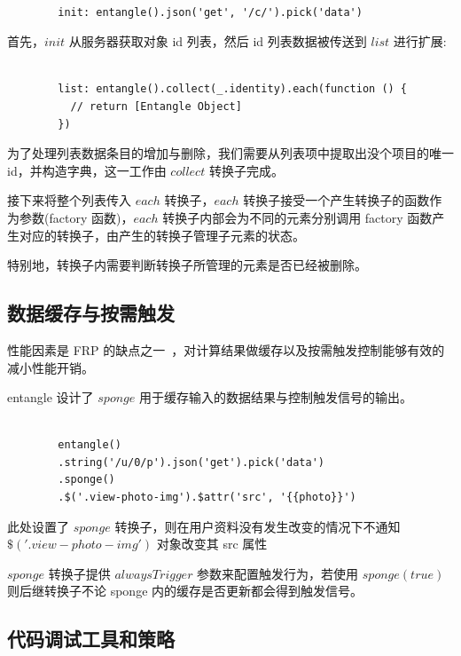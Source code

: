 \begin{verbatim}

        init: entangle().json('get', '/c/').pick('data')

\end{verbatim}

首先，$init$ 从服务器获取对象 id 列表，然后 id 列表数据被传送到 $list$ 进行扩展:

\begin{verbatim}

        list: entangle().collect(_.identity).each(function () {
          // return [Entangle Object]
        })

\end{verbatim}

为了处理列表数据条目的增加与删除，我们需要从列表项中提取出没个项目的唯一 id，并构造字典，这一工作由 $collect$ 转换子完成。

接下来将整个列表传入 $each$ 转换子，$each$ 转换子接受一个产生转换子的函数作为参数(factory 函数)，$each$ 转换子内部会为不同的元素分别调用 factory 函数产生对应的转换子，由产生的转换子管理子元素的状态。

特别地，转换子内需要判断转换子所管理的元素是否已经被删除。

\subsection{数据缓存与按需触发}

性能因素是 FRP 的缺点之一~\cite{Elliott:2009:PFR:1596638.1596643}，对计算结果做缓存以及按需触发控制能够有效的减小性能开销。

entangle 设计了 $sponge$ 用于缓存输入的数据结果与控制触发信号的输出。

\begin{verbatim}

        entangle()
        .string('/u/0/p').json('get').pick('data')
        .sponge()
        .$('.view-photo-img').$attr('src', '{{photo}}')

\end{verbatim}

此处设置了 $sponge$ 转换子，则在用户资料没有发生改变的情况下不通知 $\$('.view-photo-img')$ 对象改变其 src 属性

$sponge$ 转换子提供 $alwaysTrigger$ 参数来配置触发行为，若使用 $sponge(true)$ 则后继转换子不论 sponge 内的缓存是否更新都会得到触发信号。

\subsection{代码调试工具和策略}

